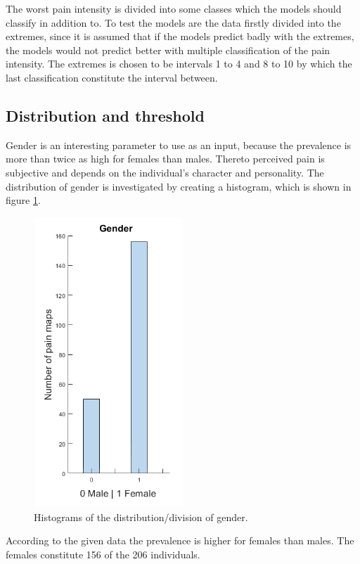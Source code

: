 \noindent
The worst pain intensity is divided into some classes which the models should classify in addition to. To test the models are the data firstly divided into the extremes, since it is assumed that if the models predict badly with the extremes, the models would not predict better with multiple classification of the pain intensity. The extremes is chosen to be intervals 1 to 4 and 8 to 10 by which the last classification constitute the interval between. 


\subsection{Distribution and threshold}
Gender is an interesting parameter to use as an input, because the prevalence is more than twice as high for females than males. Thereto perceived pain is subjective and depends on the individual's character and personality. The distribution of gender is investigated by creating a histogram, which is shown in figure \ref{fig:histogender}. 

\begin{figure} [H]
\centering
\includegraphics[width=0.5\textwidth]{figures/histogramGender}
\caption{Histograms of the distribution/division of gender.}
\label{fig:histogender}
\end{figure}

\noindent
According to the given data the prevalence is higher for females than males. The females constitute 156 of the 206 individuals.

